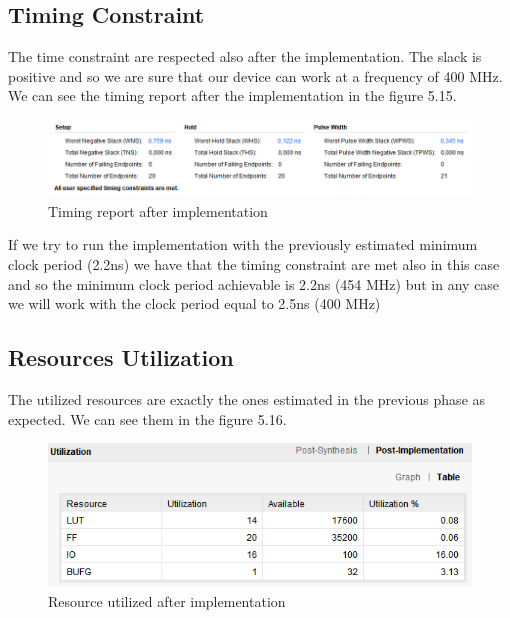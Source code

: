 \documentclass[a4paper]{report}
\begin{document}
\subsection{Timing Constraint}
The time constraint are respected also after the implementation. The slack is positive and so we are sure that our device can work at a frequency of 400 MHz. We can see the timing report after the implementation in the figure 5.15.

\begin{figure}[htpb]
	\centering
	\includegraphics[scale=0.7]{img/vivado/implementation_timing.png}
	\caption{Timing report after implementation}
\end{figure}

\noindent If we try to run the implementation with the previously estimated minimum clock period (2.2ns) we have that the timing constraint are met also in this case and so the minimum clock period achievable is 2.2ns (454 MHz) but in any case we will work with the clock period equal to 2.5ns (400 MHz)
\subsection{Resources Utilization}
The utilized resources are exactly the ones estimated in the previous phase as expected. We can see them in the figure 5.16.
\begin{figure}[htpb]
	\centering
	\includegraphics[scale=0.7]{img/vivado/utilization.png}
	\caption{Resource utilized after implementation}
\end{figure}
\end{document}
